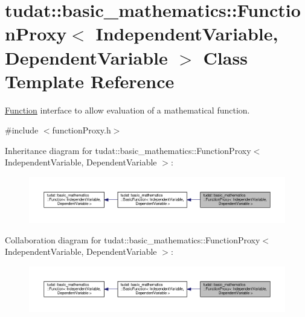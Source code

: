 \hypertarget{classtudat_1_1basic__mathematics_1_1FunctionProxy}{}\section{tudat\+:\+:basic\+\_\+mathematics\+:\+:Function\+Proxy$<$ Independent\+Variable, Dependent\+Variable $>$ Class Template Reference}
\label{classtudat_1_1basic__mathematics_1_1FunctionProxy}


\hyperlink{classtudat_1_1basic__mathematics_1_1Function}{Function} interface to allow evaluation of a mathematical function.  




{\ttfamily \#include $<$function\+Proxy.\+h$>$}



Inheritance diagram for tudat\+:\+:basic\+\_\+mathematics\+:\+:Function\+Proxy$<$ Independent\+Variable, Dependent\+Variable $>$\+:
\nopagebreak
\begin{figure}[H]
\begin{center}
\leavevmode
\includegraphics[width=350pt]{classtudat_1_1basic__mathematics_1_1FunctionProxy__inherit__graph}
\end{center}
\end{figure}


Collaboration diagram for tudat\+:\+:basic\+\_\+mathematics\+:\+:Function\+Proxy$<$ Independent\+Variable, Dependent\+Variable $>$\+:
\nopagebreak
\begin{figure}[H]
\begin{center}
\leavevmode
\includegraphics[width=350pt]{classtudat_1_1basic__mathematics_1_1FunctionProxy__coll__graph}
\end{center}
\end{figure}

